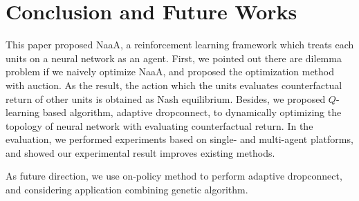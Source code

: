 \section{Conclusion and Future Works}
This paper proposed NaaA, a reinforcement learning framework which treats each units on a neural network as an agent.
First, we pointed out there are dilemma problem if we naively optimize NaaA, and
proposed the optimization method with auction.
As the result, the action which the units evaluates counterfactual return of other units is obtained as Nash equilibrium.
Besides, we proposed $Q$-learning based algorithm, adaptive dropconnect, to dynamically optimizing the topology of neural network with evaluating counterfactual return.
In the evaluation, we performed experiments based on single- and multi-agent platforms, and showed our experimental result improves existing methods.

As future direction, we use on-policy method to perform adaptive dropconnect, and
considering application combining genetic algorithm.
